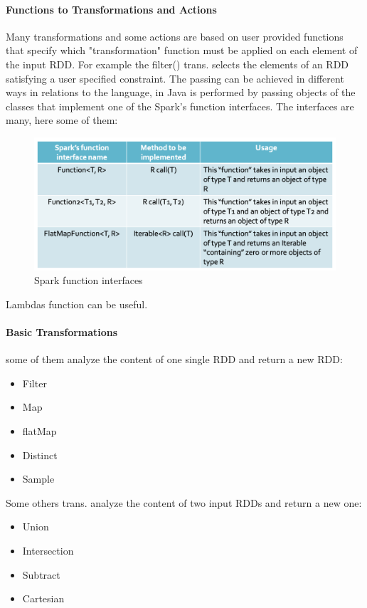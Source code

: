 \documentclass[12pt]{article}
\begin{document}
\paragraph{Functions to Transformations and Actions} Many transformations and some actions are based on user provided functions that specify which "transformation" function must be applied on each element of the input RDD. For example the filter() trans. selects the elements of an RDD satisfying a user specified constraint. The passing can be achieved in different ways in relations to the language, in Java is performed by passing objects of the classes that implement one of the Spark's function interfaces. The interfaces are many, here some of them:
\begin{figure}[H]
  \includegraphics[width=\linewidth]{images/interface.png}
  \caption{Spark function interfaces}
  \label{fig:interface}
\end{figure}
Lambdas function can be useful.
\paragraph{Basic Transformations} some of them analyze the content of one single RDD and return a new RDD:
\begin{itemize}
  \item Filter \item Map \item flatMap \item Distinct \item Sample
\end{itemize}
Some others trans. analyze the content of two input RDDs and return a new one:
\begin{itemize}
  \item Union \item Intersection \item Subtract \item Cartesian
\end{itemize}
\end{document}
